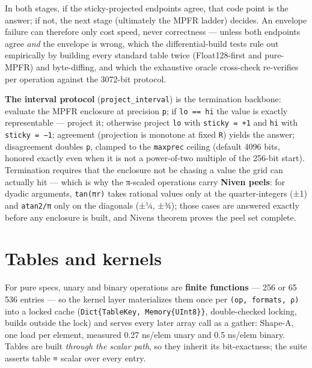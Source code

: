 In both stages, if the sticky-projected endpoints agree, that code point is the answer; if not, the next stage (ultimately the MPFR ladder) decides. An envelope failure can therefore only cost speed, never correctness — unless both endpoints agree \emph{and} the envelope is wrong, which the differential-build tests rule out empirically by building every standard table twice (Float128-first and pure-MPFR) and byte-diffing, and which the exhaustive oracle cross-check re-verifies per operation against the 3072-bit protocol.



\textbf{The interval protocol} (\texttt{project\_interval}) is the termination backbone: evaluate the MPFR enclosure at precision \texttt{p}; if \texttt{lo == hi} the value is exactly representable — project it; otherwise project \texttt{lo} with \texttt{sticky = +1} and \texttt{hi} with \texttt{sticky = −1}; agreement (projection is monotone at fixed \texttt{R}) yields the answer; disagreement doubles \texttt{p}, clamped to the \texttt{maxprec} ceiling (default 4096 bits, honored exactly even when it is not a power-of-two multiple of the 256-bit start). Termination requires that the enclosure not be chasing a value the grid can actually hit — which is why the π-scaled operations carry \textbf{Niven peels}: for dyadic arguments, \texttt{tan(πr)} takes rational values only at the quarter-integers (±1) and \texttt{atan2/π} only on the diagonals (±¼, ±¾); those cases are answered exactly before any enclosure is built, and Niven{\textquotesingle}s theorem proves the peel set complete.



\section{Tables and kernels}



\label{17163678065643276217}{}


For pure specs, unary and binary operations are \textbf{finite functions} — 256 or 65 536 entries — so the kernel layer materializes them once per \texttt{(op, formats, ρ)} into a locked cache (\texttt{Dict\{TableKey, Memory\{UInt8\}\}}, double-checked locking, builds outside the lock) and serves every later array call as a gather: Shape-A, one load per element, measured 0.27 ns/elem unary and 0.5 ns/elem binary. Tables are built \emph{through the scalar path}, so they inherit its bit-exactness; the suite asserts table ≡ scalar over every entry.



